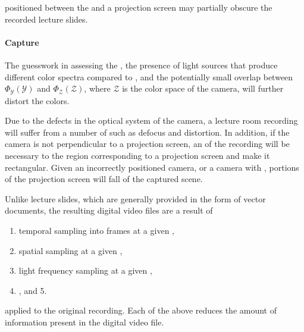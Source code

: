  positioned between the  and a projection
screen may partially obscure the recorded lecture slides.

\paragraph{Capture} The guesswork in assessing the ,
the presence of light sources that produce different color spectra compared to
, and the potentially small overlap between $\Phi_{\mathcal
Y}(\mathcal Y)$ and $\Phi_{\mathcal Z}(\mathcal Z)$, where $\mathcal Z$ is the
color space of the camera, will further distort the colors.

Due to the defects in the optical system of the camera, a lecture room
recording will suffer from a number of  such as defocus and
distortion. In addition, if the camera is not perpendicular to a projection
screen, an  of the recording will be
necessary to  the region corresponding to a projection screen
and make it rectangular. Given an incorrectly positioned camera, or a camera
with , portions of the projection screen will fall
 of the captured scene.

Unlike lecture slides, which are generally provided in the form of vector
 documents, the resulting digital video files are a result of
\begin{enumerate}
  \item temporal sampling into frames at a given ,
  \item spatial sampling at a given ,
  \item light frequency sampling at a given ,
  \item {}, and 5. 
\end{enumerate}
applied to the original recording. Each of the above reduces the amount of
information present in the digital video file.

